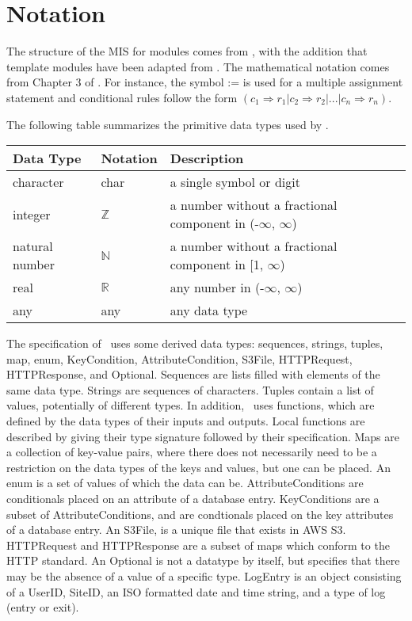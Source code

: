 \documentclass[12pt, titlepage]{article}
\begin{document}
\section{Notation}


The structure of the MIS for modules comes from \citet{HoffmanAndStrooper1995},
with the addition that template modules have been adapted from
\cite{GhezziEtAl2003}.  The mathematical notation comes from Chapter 3 of
\citet{HoffmanAndStrooper1995}.  For instance, the symbol := is used for a
multiple assignment statement and conditional rules follow the form $(c_1
\Rightarrow r_1 | c_2 \Rightarrow r_2 | ... | c_n \Rightarrow r_n )$.

The following table summarizes the primitive data types used by \progname.

\begin{center}
  \renewcommand{\arraystretch}{1.2}
  \noindent
  \begin{tabular}{l l p{7.5cm}}
    \toprule
    \textbf{Data Type} & \textbf{Notation} & \textbf{Description}\\
    \midrule
    character & char & a single symbol or digit\\
    integer & $\mathbb{Z}$ & a number without a fractional component
    in (-$\infty$, $\infty$) \\
    natural number & $\mathbb{N}$ & a number without a fractional
    component in [1, $\infty$) \\
    real & $\mathbb{R}$ & any number in (-$\infty$, $\infty$)\\
    any & any & any data type\\
    \bottomrule
  \end{tabular}
\end{center}

\noindent
The specification of \progname \ uses some derived data types:
sequences, strings, tuples, map, enum, KeyCondition,
AttributeCondition, S3File, HTTPRequest, HTTPResponse, and Optional. Sequences
are lists filled with elements of the same data type. Strings
are sequences of characters. Tuples contain a list of values, potentially of
different types. In addition, \progname \ uses functions, which
are defined by the data types of their inputs and outputs. Local functions are
described by giving their type signature followed by their specification. Maps
are a collection of key-value pairs, where there does not necessarily need to
be a restriction on the data types of the keys and values, but one can be
placed. An enum is a set of values of which the data can be.
AttributeConditions are conditionals placed on an attribute of a
database entry. KeyConditions are a subset of AttributeConditions,
and are condtionals placed on the key attributes of a database entry.
An S3File, is a unique file that exists in AWS S3. HTTPRequest and HTTPResponse
are a subset of maps which conform to the HTTP standard. An Optional is not a
datatype by itself, but specifies that there may be the absence of a value of a
specific type. LogEntry is an object consisting of a UserID, SiteID, an ISO
formatted date and time string, and a type of log (entry or exit).
\end{document}
